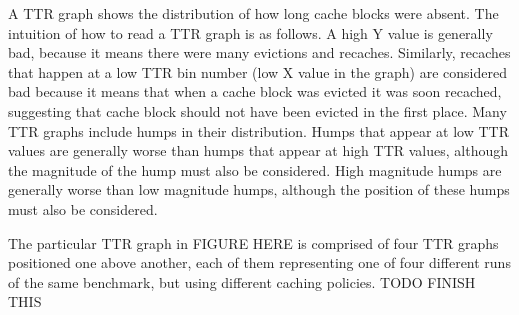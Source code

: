A TTR graph shows the distribution of how long cache blocks were
absent.  The intuition of how to read a TTR graph is as follows.  A
high Y value is generally bad, because it means there were many evictions
and recaches.  Similarly, recaches that happen at a low TTR bin number
(low X value in the graph) are considered bad because it means that
when a cache block was evicted it was soon recached, suggesting that
cache block should not have been evicted in the first place.  Many TTR
graphs include humps in their distribution.  Humps that appear at low
TTR values are generally worse than humps that appear at high TTR
values, although the magnitude of the hump must also be considered.
High magnitude humps are generally worse than low magnitude humps,
although the position of these humps must also be considered.

The particular TTR graph in FIGURE HERE is comprised of four TTR
graphs positioned one above another, each of them representing one of
four different runs of the same benchmark, but using different caching
policies.  TODO FINISH THIS
